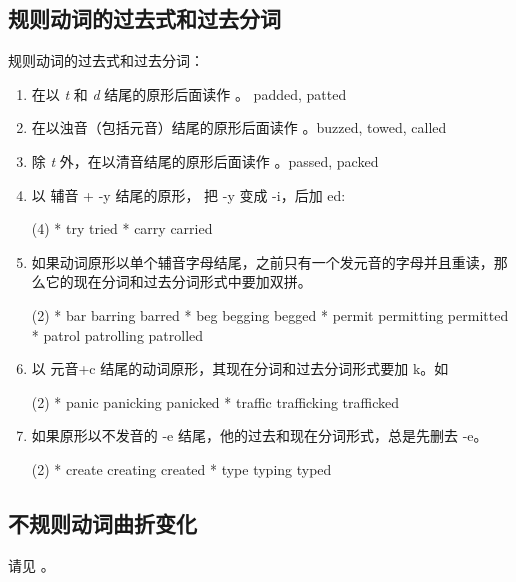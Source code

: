 \subsection{规则动词的过去式和过去分词}

规则动词的过去式和过去分词：
\begin{enumerate}
\item 在以 \emph{t} 和 \emph{d} 结尾的原形后面读作 。 padded, patted
\item 在以浊音（包括元音）结尾的原形后面读作 。buzzed, towed, called
\item 除 \emph{t} 外，在以清音结尾的原形后面读作 。passed, packed
\item 以 辅音 + -y 结尾的原形， 把 -y 变成 -i，后加 ed:
  \begin{taskitem}(4)
    * try \Rightarrow tried
    * carry  \Rightarrow carried
  \end{taskitem}

\item 如果动词原形以单个辅音字母结尾，之前只有一个发元音的字母并且重读，那么它的现在分词和过去分词形式中要加双拼。
  \begin{taskitem}(2)
    * bar \Rightarrow barring \Rightarrow barred
    * beg \Rightarrow begging \Rightarrow begged
    * permit \Rightarrow permitting \Rightarrow permitted
    * patrol \Rightarrow patrolling \Rightarrow patrolled
  \end{taskitem}

\item 以 元音+c 结尾的动词原形，其现在分词和过去分词形式要加 k。如
  \begin{taskitem}(2)
    * panic \Rightarrow panicking \Rightarrow panicked
    * traffic \Rightarrow trafficking \Rightarrow trafficked
  \end{taskitem}

\item 如果原形以不发音的 -e 结尾，他的过去和现在分词形式，总是先删去 -e。
  \begin{taskitem}(2)
    * create \Rightarrow creating \Rightarrow created
    * type \Rightarrow typing \Rightarrow typed
  \end{taskitem}
\end{enumerate}

\subsection{不规则动词曲折变化}

请见 。

